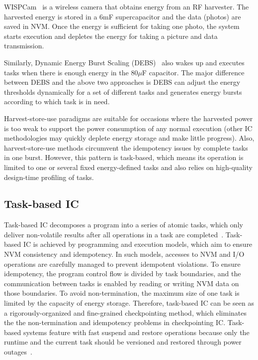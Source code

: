 WISPCam~\cite{naderiparizi2015wispcam} is a wireless camera that obtains energy from an RF harvester. The harvested energy is stored in a 6mF supercapacitor and the data (photos) are saved in NVM. Once the energy is sufficient for taking one photo, the system starts execution and depletes the energy for taking a picture and data transmission. 

Similarly, Dynamic Energy Burst Scaling (DEBS)~\cite{gomez2016dynamic} also wakes up and executes tasks when there is enough energy in the 80$\mu$F capacitor. The major difference between DEBS and the above two approaches is DEBS can adjust the energy thresholds dynamically for a set of different tasks and generates energy bursts according to which task is in need.

Harvest-store-use paradigms are suitable for occasions where the harvested power is too weak to support the power consumption of any normal execution (other IC methodologies may quickly deplete energy storage and make little progress). Also, harvest-store-use methods circumvent the idempotency issues by complete tasks in one burst. However, this pattern is task-based, which means its operation is limited to one or several fixed energy-defined tasks and also relies on high-quality design-time profiling of tasks.

\subsection{Task-based IC}

Task-based IC decomposes a program into a series of atomic tasks, which only deliver non-volatile results after all operations in a task are completed~\cite{lucia2015simpler}. Task-based IC is achieved by programming and execution models, which aim to ensure NVM consistency and idempotency. In such models, accesses to NVM and I/O operations are carefully managed to prevent idempotent violations. To ensure idempotency, the program control flow is divided by task boundaries, and the communication between tasks is enabled by reading or writing NVM data on those boundaries. To avoid non-termination, the maximum size of one task is limited by the capacity of energy storage. Therefore, task-based IC can be seen as a rigorously-organized and fine-grained checkpointing method, which eliminates the the non-termination and idempotency problems in checkpointing IC. Task-based systems feature with fast suspend and restore operations because only the runtime and the current task should be versioned and restored through power outages~\cite{sliper2018enabling}. 

